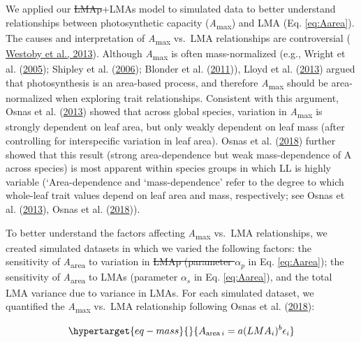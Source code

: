 \documentclass[
  12pt,
  a4paper,
,tablecaptionabove
]{scrartcl}
\providecommand{\DIFaddtex}[1]{{\protect\color{blue}\uwave{#1}}} %
\providecommand{\DIFdeltex}[1]{{\protect\color{red}\sout{#1}}}                      %
\providecommand{\DIFaddbegin}{} %
\providecommand{\DIFaddend}{} %
\providecommand{\DIFdelbegin}{} %
\providecommand{\DIFdelend}{} %
\providecommand{\DIFadd}[1]{\texorpdfstring{\DIFaddtex{#1}}{#1}} %
\providecommand{\DIFdel}[1]{\texorpdfstring{\DIFdeltex{#1}}{}} %
\newcommand{\DIFscaledelfig}{0.5}
\newlength{\DIFdelgraphicswidth} %
\newlength{\DIFdelgraphicsheight} %
\newcommand{\DIFaddincludegraphics}[2][]{{\color{blue}\fbox{\DIFOincludegraphics[#1]{#2}}}} %
\newcommand{\DIFdelincludegraphics}[2][]{%
\sbox{\DIFdelgraphicsbox}{\DIFOincludegraphics[#1]{#2}}%
\settoboxwidth{\DIFdelgraphicswidth}{\DIFdelgraphicsbox} %
\settoboxtotalheight{\DIFdelgraphicsheight}{\DIFdelgraphicsbox} %
\scalebox{\DIFscaledelfig}{%
\parbox[b]{\DIFdelgraphicswidth}{\usebox{\DIFdelgraphicsbox}\\[-\baselineskip] \rule{\DIFdelgraphicswidth}{0em}}\llap{\resizebox{\DIFdelgraphicswidth}{\DIFdelgraphicsheight}{%
\setlength{\unitlength}{\DIFdelgraphicswidth}%
\begin{picture}(1,1)%
\thicklines\linethickness{2pt} %
{\color[rgb]{1,0,0}\put(0,0){\framebox(1,1){}}}%
{\color[rgb]{1,0,0}\put(0,0){\line( 1,1){1}}}%
{\color[rgb]{1,0,0}\put(0,1){\line(1,-1){1}}}%
\end{picture}%
}\hspace*{3pt}}} %
} %
\DeclareRobustCommand{\DIFaddbegin}{\DIFOaddbegin \let\includegraphics\DIFaddincludegraphics} %
\DeclareRobustCommand{\DIFaddend}{\DIFOaddend \let\includegraphics\DIFOincludegraphics} %
\DeclareRobustCommand{\DIFdelbegin}{\DIFOdelbegin \let\includegraphics\DIFdelincludegraphics} %
\DeclareRobustCommand{\DIFdelend}{\DIFOaddend \let\includegraphics\DIFOincludegraphics} %
\begin{document}
We applied our \DIFdelbegin \DIFdel{LMAp}\DIFdelend \DIFaddbegin \DIFadd{LMAm}\DIFaddend +LMAs model to simulated data to better understand
relationships between photosynthetic capacity
(\emph{A}\textsubscript{max}) and LMA (Eq. \ref{eq:Aarea}). The causes
and interpretation of \emph{A}\textsubscript{max} vs.~LMA relationships
are controversial (\protect\DIFdelbegin %
\DIFdelend \DIFaddbegin \hyperlink{ref-Westoby2013}{Westoby et al.,
2013}\DIFaddend ). Although \emph{A}\textsubscript{max} is often mass-normalized
(e.g., \DIFaddbegin \DIFadd{I. J. }\DIFaddend Wright et al. (\protect\hyperlink{ref-Wright2005}{2005});
Shipley et al. (\protect\hyperlink{ref-Shipley2006}{2006}); Blonder et
al. (\protect\hyperlink{ref-Blonder2011}{2011})), Lloyd et al.
(\protect\hyperlink{ref-Lloyd2013}{2013}) argued that photosynthesis is
an area-based process, and therefore \emph{A}\textsubscript{max} should
be area-normalized when exploring trait relationships. Consistent with
this argument, Osnas et al. (\protect\hyperlink{ref-Osnas2013}{2013})
showed that across global species, variation in
\emph{A}\textsubscript{max} is strongly dependent on leaf area, but only
weakly dependent on leaf mass (after controlling for interspecific
variation in leaf area). Osnas et al.
(\protect\hyperlink{ref-Osnas2018}{2018}) further showed that this
result (strong area-dependence but weak mass-dependence of A across
species) is most apparent within species groups in which LL is highly
variable (`Area-dependence and `mass-dependence' refer to the degree to
which whole-leaf trait values depend on leaf area and mass,
respectively; see Osnas et al.
(\protect\hyperlink{ref-Osnas2013}{2013}), Osnas et al.
(\protect\hyperlink{ref-Osnas2018}{2018})).

To better understand the factors affecting \emph{A}\textsubscript{max}
vs.~LMA relationships, we created simulated datasets in which we varied
the following factors: the sensitivity of \emph{A}\textsubscript{area}
to variation in \DIFdelbegin \DIFdel{LMAp (parameter \(\alpha_p\) }\DIFdelend \DIFaddbegin \DIFadd{LMAm (parameter \(\alpha_m\) }\DIFaddend in Eq. \ref{eq:Aarea}); the
sensitivity of \emph{A}\textsubscript{area} to LMAs (parameter
\(\alpha_s\) in Eq. \ref{eq:Aarea}), and the total LMA variance due to
variance in LMAs. For each simulated dataset, we quantified the
\emph{A}\textsubscript{max} vs.~LMA relationship following Osnas et al.
(\protect\hyperlink{ref-Osnas2018}{2018}):

\begin{equation}\protect\hypertarget{eq-mass}{}{
A_{\mathrm{area} \, i} = a (LMA_i)^{b}\epsilon_i
}\label{eq-mass}\end{equation}
\end{document}
